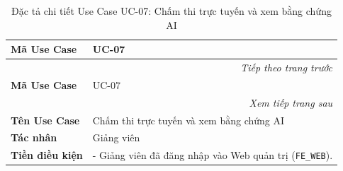 \documentclass[../DoAn.tex]{subfiles}
\begin{document}
\begin{longtable}{|p{2.8cm}|p{0.8cm}|p{2.2cm}|p{7.5cm}|}
    \caption{Đặc tả chi tiết Use Case UC-07: Chấm thi trực tuyến và xem bằng chứng AI}
    \label{table:spec_uc_07} \\
    \hline
    \textbf{Mã Use Case} & \multicolumn{3}{l|}{UC-07} \\ \hline
    \endfirsthead
    \multicolumn{4}{r}{\textit{Tiếp theo trang trước}} \\
    \hline
    \textbf{Mã Use Case} & \multicolumn{3}{l|}{UC-07} \\ \hline
    \endhead
    \hline
    \multicolumn{4}{r}{\textit{Xem tiếp trang sau}} \\
    \endfoot
    \hline
    \endlastfoot
    \textbf{Tên Use Case} & \multicolumn{3}{l|}{Chấm thi trực tuyến và xem bằng chứng AI} \\ \hline
    \textbf{Tác nhân} & \multicolumn{3}{l|}{Giảng viên} \\ \hline
    \textbf{Tiền điều kiện} & \multicolumn{3}{p{10.9cm}|}{- Giảng viên đã đăng nhập vào Web quản trị (\mbox{\texttt{FE\_WEB}}). 

}
\end{longtable}
\end{document}
